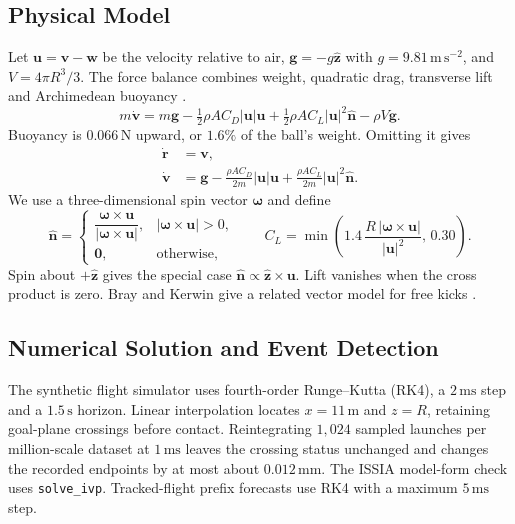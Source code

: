 \documentclass[11pt,a4paper]{article}
\begin{document}
\subsection{Physical Model}
\label{sec:forces}

Let $\mathbf u=\mathbf v-\mathbf w$ be the velocity relative to air, $\mathbf g=-g\hat{\mathbf z}$ with $g=9.81\,\mathrm{m\,s^{-2}}$, and $V=4\pi R^3/3$. The force balance combines weight, quadratic drag, transverse lift and Archimedean buoyancy \cite{nasaforces,nasadrag,nasalift,archimedes}.
\begin{equation}
  m\dot{\mathbf v}=m\mathbf g-\tfrac12\rho A C_D|\mathbf u|\mathbf u
  +\tfrac12\rho A C_L|\mathbf u|^2\hat{\mathbf n}-\rho V\mathbf g.
  \label{eq:full}
\end{equation}
Buoyancy is $0.066\,\mathrm{N}$ upward, or $1.6\%$ of the ball's weight. Omitting it gives
\begin{align}
  \dot{\mathbf r}&=\mathbf v,\label{eq:kin}\\
  \dot{\mathbf v}&=\mathbf g-\frac{\rho A C_D}{2m}|\mathbf u|\mathbf u
    +\frac{\rho A C_L}{2m}|\mathbf u|^2\hat{\mathbf n}.\label{eq:dyn}
\end{align}
We use a three-dimensional spin vector $\boldsymbol\omega$ and define
\begin{equation}
  \hat{\mathbf{n}}=
  \begin{cases}
    \dfrac{\boldsymbol{\omega}\times\mathbf{u}}{|\boldsymbol{\omega}\times\mathbf{u}|}, & |\boldsymbol{\omega}\times\mathbf{u}|>0,\\[2mm]
    \mathbf{0}, & \text{otherwise},
  \end{cases}
  \qquad
  C_L=\min\!\left(1.4\,\frac{R\,|\boldsymbol{\omega}\times\mathbf{u}|}{|\mathbf{u}|^2},\,0.30\right).
  \label{eq:lift}
\end{equation}
Spin about $+\hat{\mathbf z}$ gives the special case $\hat{\mathbf n}\propto\hat{\mathbf z}\times\mathbf u$. Lift vanishes when the cross product is zero. Bray and Kerwin give a related vector model for free kicks \cite{bray2003}.

\subsection{Numerical Solution and Event Detection}

The synthetic flight simulator uses fourth-order Runge--Kutta (RK4), a $2\,\mathrm{ms}$ step and a $1.5\,\mathrm{s}$ horizon. Linear interpolation locates $x=11\,\mathrm{m}$ and $z=R$, retaining goal-plane crossings before contact. Reintegrating $1{,}024$ sampled launches per million-scale dataset at $1\,\mathrm{ms}$ leaves the crossing status unchanged and changes the recorded endpoints by at most about $0.012\,\mathrm{mm}$. The ISSIA model-form check uses \texttt{solve\_ivp}. Tracked-flight prefix forecasts use RK4 with a maximum $5\,\mathrm{ms}$ step.
\end{document}

